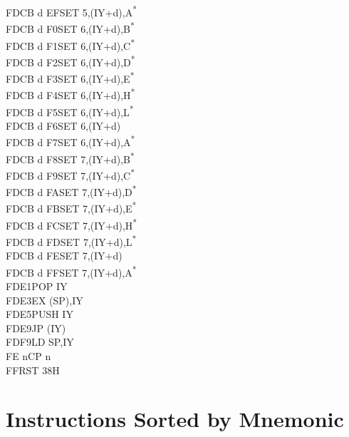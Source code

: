 \documentclass[twoside,openright,a4paper]{book}
\begin{document}
\begin{multicols}{3}
{\begin{tabbing}
	FDCB d EF\>SET 5,(IY+d),A\textsuperscript{*}\\
	FDCB d F0\>SET 6,(IY+d),B\textsuperscript{*}\\
	FDCB d F1\>SET 6,(IY+d),C\textsuperscript{*}\\
	FDCB d F2\>SET 6,(IY+d),D\textsuperscript{*}\\
	FDCB d F3\>SET 6,(IY+d),E\textsuperscript{*}\\
	FDCB d F4\>SET 6,(IY+d),H\textsuperscript{*}\\
	FDCB d F5\>SET 6,(IY+d),L\textsuperscript{*}\\
	FDCB d F6\>SET 6,(IY+d)\\
	FDCB d F7\>SET 6,(IY+d),A\textsuperscript{*}\\
	FDCB d F8\>SET 7,(IY+d),B\textsuperscript{*}\\
	FDCB d F9\>SET 7,(IY+d),C\textsuperscript{*}\\
	FDCB d FA\>SET 7,(IY+d),D\textsuperscript{*}\\
	FDCB d FB\>SET 7,(IY+d),E\textsuperscript{*}\\
	FDCB d FC\>SET 7,(IY+d),H\textsuperscript{*}\\
	FDCB d FD\>SET 7,(IY+d),L\textsuperscript{*}\\
	FDCB d FE\>SET 7,(IY+d)\\
	FDCB d FF\>SET 7,(IY+d),A\textsuperscript{*}\\
	FDE1\>POP IY\\
	FDE3\>EX (SP),IY\\
	FDE5\>PUSH IY\\
	FDE9\>JP (IY)\\
	FDF9\>LD SP,IY\\
	FE n\>CP n\\
	FF\>RST 38H
\end{tabbing}
}
\end{multicols}
\normalsize




\chapter{Instructions Sorted by Mnemonic}
\end{document}
